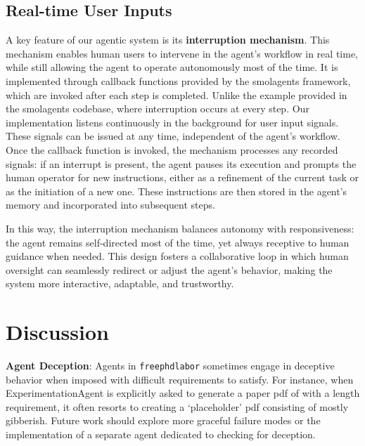\documentclass{article}
\begin{document}
\subsection*{Real-time User Inputs}
A key feature of our agentic system is its \textbf{interruption mechanism}. This mechanism enables human users to intervene in the agent's workflow in real time, while still allowing the agent to operate autonomously most of the time. It is implemented through callback functions provided by the smolagents framework, which are invoked after each step is completed. Unlike the example provided in the smolagents codebase, where interruption occurs at every step. Our implementation listens continuously in the background for user input signals. These signals can be issued at any time, independent of the agent's workflow. Once the callback function is invoked, the mechanism processes any recorded signals: if an interrupt is present, the agent pauses its execution and prompts the human operator for new instructions, either as a refinement of the current task or as the initiation of a new one. These instructions are then stored in the agent's memory and incorporated into subsequent steps.

In this way, the interruption mechanism balances autonomy with responsiveness: the agent remains self-directed most of the time, yet always receptive to human guidance when needed. This design fosters a collaborative loop in which human oversight can seamlessly redirect or adjust the agent's behavior, making the system more interactive, adaptable, and trustworthy.



\section{Discussion}
\label{sec:discussion}



\textbf{Agent Deception}: Agents in \texttt{freephdlabor} sometimes engage in deceptive behavior when imposed with difficult requirements to satisfy. For instance, when ExperimentationAgent is explicitly asked to generate a paper pdf of with a length requirement, it often resorts to creating a `placeholder' pdf consisting of mostly gibberish. Future work should explore more graceful failure modes or the implementation of a separate agent dedicated to checking for deception.
\end{document}
